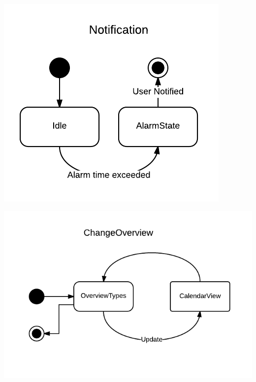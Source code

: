 \includegraphics[scale=0.6]{Notification-StateDiagram}

\includegraphics[scale=0.5]{ChangeOverview-StateDiagram}